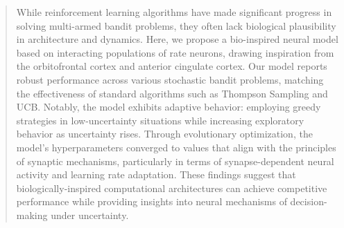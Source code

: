 
\begin{abstract}
While reinforcement learning algorithms have made significant progress in solving multi-armed bandit problems, they often lack biological plausibility in architecture and dynamics.
Here, we propose a bio-inspired neural model based on interacting populations of rate neurons, drawing inspiration from the orbitofrontal cortex and anterior cingulate cortex.
Our model reports robust performance across various stochastic bandit problems, matching the effectiveness of standard algorithms such as Thompson Sampling and UCB.
Notably, the model exhibits adaptive behavior: employing greedy strategies in low-uncertainty situations while increasing exploratory behavior as uncertainty rises.
Through evolutionary optimization, the model's hyperparameters converged to values that align with the principles of synaptic mechanisms, particularly in terms of synapse-dependent neural activity and learning rate adaptation.
These findings suggest that biologically-inspired computational architectures can achieve competitive performance while providing insights into neural mechanisms of decision-making under uncertainty.
\end{abstract}
